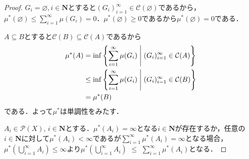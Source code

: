 \documentclass[12pt,a4paper]{jsarticle}
\begin{document}
\begin{proof}
    $G_i = \varnothing, i \in \bm{N}$とすると$(G_i)_{i = 1}^\infty \in \mathcal{C}(\varnothing)$であるから，$\mu^*(\varnothing) \leq \sum_{i = 1}^\infty \mu(G_i) = 0$．$\mu^*(\varnothing) \geq 0$であるから$\mu^*(\varnothing) = 0$である．

    $A \subseteq B$とすると$\mathcal{C}(B) \subseteq \mathcal{C}(A)$であるから
    \begin{align*}
        \mu^*(A)
        &= \inf \left\{\sum_{i = 1}^\infty \mu(G_i) \mathrel{}\middle|\mathrel{} (G_i)_{i = 1}^\infty \in \mathcal{C}(A)\right\} \\
        &\leq \inf \left\{\sum_{i = 1}^\infty \mu(G_i) \mathrel{}\middle|\mathrel{} (G_i)_{i = 1}^\infty \in \mathcal{C}(B)\right\} \\
        &= \mu^*(B)
    \end{align*}
    である．よって$\mu^*$は単調性をみたす．

    $A_i \in \mathcal{P}(X)$, $i \in \bm{N}$とする．$\mu^*(A_i) = \infty$となる$i \in \bm{N}$が存在するか，任意の$i \in \bm{N}$に対して$\mu^*(A_i) < \infty$であるが$\sum_{i = 1}^\infty \mu^*(A_i) = \infty$となる場合，$\mu^*(\bigcup_{i = 1}^\infty A_i) \leq \infty$より$\mu^*(\bigcup_{i = 1}^\infty A_i)$ $\leq$ $\sum_{i = 1}^\infty \mu^*(A_i)$となる．


\end{proof}
\end{document}
